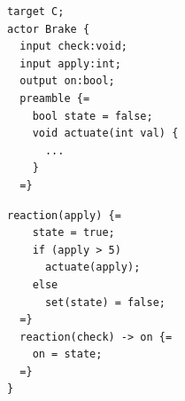 \documentclass[sigconf]{acmart}
\newcommand{\marten}[1]{\mynote{Marten}{#1}{cyan}}%
\newcommand{\edward}[1]{\mynote{Edward}{#1}{magenta}}%
\begin{document}


\begin{minipage}{0.50\linewidth}
\begin{lstlisting}[language=LF,numbers=none]
target C;
actor Brake {
  input check:void;
  input apply:int;
  output on:bool;
  preamble {=
  	bool state = false;
  	void actuate(int val) { 
  	  ...
  	} 
  =}
\end{lstlisting}
\end{minipage}%
\begin{minipage}{0.50\linewidth}
\begin{lstlisting}[numbers=none]
  reaction(apply) {=
    state = true;
    if (apply > 5)
      actuate(apply);
    else
      set(state) = false;
  =}
  reaction(check) -> on {=
    on = state;
  =}
}
\end{lstlisting}
\end{minipage}
\end{document}

